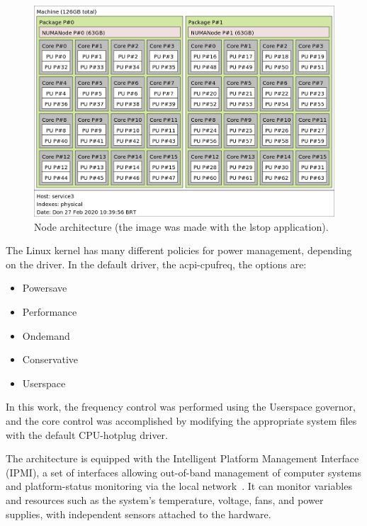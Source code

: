 \begin{figure}[htb!]
	\centering
	\includegraphics[width=\columnwidth]{models/figures/architecture.png}
	\caption{Node architecture (the image was made with the lstop application).}
	\label{fig:architecture}
\end{figure}

The Linux kernel has many different policies for power management, depending on the driver. In the default driver, the acpi-cpufreq, the options are:
\begin{itemize}
	\item Powersave
	\item Performance
	\item Ondemand
	\item Conservative
	\item Userspace
\end{itemize}
In this work, the frequency control was performed using the Userspace governor, and the core control was accomplished by modifying the appropriate system files with the default CPU-hotplug driver.

The architecture is equipped with the Intelligent Platform Management Interface (IPMI), a set of interfaces allowing out-of-band management of computer systems and platform-status monitoring via the local network~\cite{Schwenkler2006IntelligentInterface}. It can monitor variables and resources such as the system's temperature, voltage, fans, and power supplies, with independent sensors attached to the hardware.

